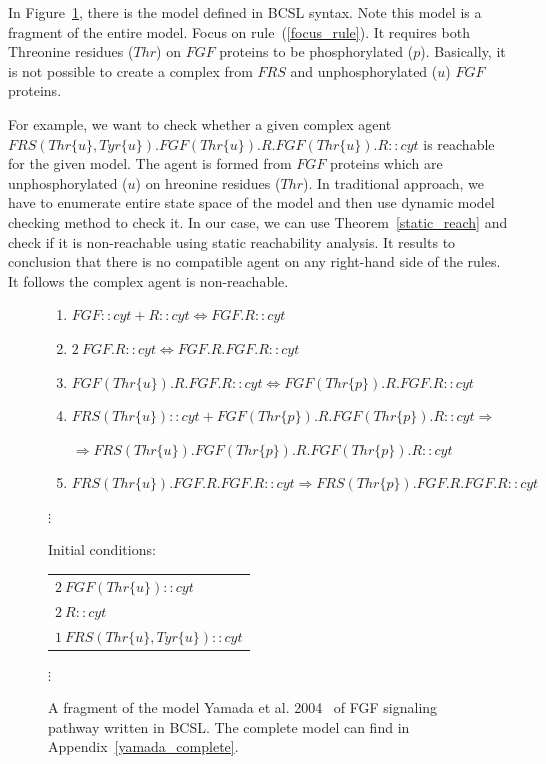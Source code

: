 \documentclass[12pt]{fithesis2}
\begin{document}
In Figure~\ref{fgf_fragment}, there is the model defined in BCSL syntax. Note this model is a fragment of the entire model. Focus on rule~(\ref{focus_rule}). It requires both Threonine residues ($Thr$) on $FGF$ proteins to be phosphorylated ($p$). Basically, it is not possible to create a complex from $FRS$ and unphosphorylated ($u$) $FGF$ proteins.

For example, we want to check whether a given complex agent {\small $FRS(Thr\{u\}, Tyr\{u\}).FGF(Thr\{u\}).R.FGF(Thr\{u\}).R::cyt$} is reachable for the given model. The agent is formed from $FGF$ proteins which are unphosphorylated ($u$) on hreonine residues ($Thr$). In traditional approach, we have to enumerate entire state space of the model and then use dynamic model checking method to check it. In our case, we can use Theorem~\ref{static_reach} and check if it is non-reachable using static reachability analysis. It results to conclusion that there is no compatible agent on any right-hand side of the rules. It follows the complex agent is non-reachable.

\begin{figure}[!h]
{\footnotesize
\begin{center}
\begin{enumerate}
\item $FGF::cyt + R::cyt \Leftrightarrow FGF.R::cyt$ 
\item $2~ FGF.R::cyt \Leftrightarrow FGF.R.FGF.R::cyt$
\item $FGF(Thr\{u\}).R.FGF.R::cyt \Leftrightarrow FGF(Thr\{p\}).R.FGF.R::cyt$ 
\item \label{focus_rule} $FRS(Thr\{u\})::cyt + FGF(Thr\{p\}).R.FGF(Thr\{p\}).R::cyt \Rightarrow$ 

$\Rightarrow FRS(Thr\{u\}).FGF(Thr\{p\}).R.FGF(Thr\{p\}).R::cyt$ 

\item $FRS(Thr\{u\}).FGF.R.FGF.R::cyt \Rightarrow FRS(Thr\{p\}).FGF.R.FGF.R::cyt$ 

\end{enumerate}

$\vdots$

\vspace*{0.5cm}
Initial conditions:
\begin{tabular}{l}
$2~ FGF(Thr\{u\})::cyt$\\
$2~ R::cyt$\\
$1~ FRS(Thr\{u\}, Tyr\{u\})::cyt$\\
\end{tabular}

$\vdots$

\end{center}

}
\caption{A fragment of the model Yamada et al. 2004~\cite{yamada2004model} of FGF signaling pathway written in BCSL. The complete model can find in Appendix~\ref{yamada_complete}.}\label{fgf_fragment}
\end{figure}
\end{document}

